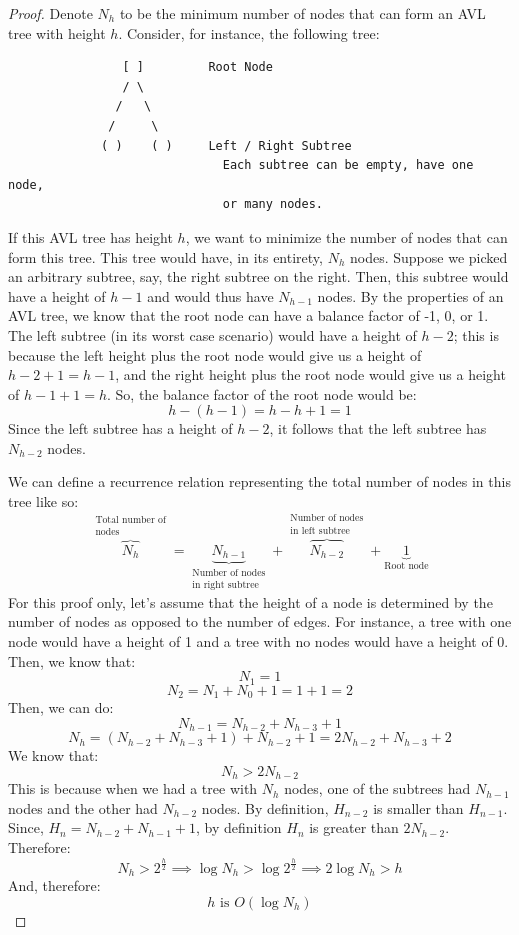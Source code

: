\documentclass[letterpaper]{article}
\begin{document}
\begin{mdframed}
    \begin{proof}
        Denote $N_h$ to be the minimum number of nodes that can form an AVL tree with height $h$. Consider, for instance, the following tree: 
    \begin{verbatim}
                [ ]         Root Node 
                / \          
               /   \ 
              /     \ 
             ( )    ( )     Left / Right Subtree 
                              Each subtree can be empty, have one node, 
                              or many nodes. 
    \end{verbatim}
    If this AVL tree has height $h$, we want to minimize the number of nodes that can form this tree. This tree would have, in its entirety, $N_h$ nodes. Suppose we picked an arbitrary subtree, say, the right subtree on the right. Then, this subtree would have a height of $h - 1$ and would thus have $N_{h - 1}$ nodes. By the properties of an AVL tree, we know that the root node can have a balance factor of -1, 0, or 1. The left subtree (in its worst case scenario) would have a height of $h - 2$; this is because the left height plus the root node would give us a height of $h - 2 + 1 = h - 1$, and the right height plus the root node would give us a height of $h - 1 + 1 = h$. So, the balance factor of the root node would be: 
    \[h - (h - 1) = h - h + 1 = 1\]
    Since the left subtree has a height of $h - 2$, it follows that the left subtree has $N_{h - 2}$ nodes. 

    \bigskip 

    We can define a recurrence relation representing the total number of nodes in this tree like so: 
    \[\overbrace{N_h}^{\substack{\text{Total number of} \\ \text{nodes}}} = \underbrace{N_{h - 1}}_{\substack{\text{Number of nodes} \\ \text{in right subtree}}} + \overbrace{N_{h - 2}}^{\substack{\text{Number of nodes} \\ \text{in left subtree}}} + \underbrace{1}_{\text{Root node}}\]
    For this proof only, let's assume that the height of a node is determined by the number of nodes as opposed to the number of edges. For instance, a tree with one node would have a height of 1 and a tree with no nodes would have a height of 0. Then, we know that: 
    \[N_1 = 1\]
    \[N_2 = N_1 + N_0 + 1 = 1 + 1 = 2\]
    Then, we can do: 
    \[N_{h - 1} = N_{h - 2} + N_{h - 3} + 1\]
    \[N_h = (N_{h - 2} + N_{h - 3} + 1) + N_{h - 2} + 1 = 2N_{h - 2} + N_{h - 3} + 2\]
    We know that: 
    \[N_h > 2N_{h - 2}\]
    This is because when we had a tree with $N_h$ nodes, one of the subtrees had $N_{h - 1}$ nodes and the other had $N_{h - 2}$ nodes. By definition, $H_{n - 2}$ is smaller than $H_{n - 1}$. Since, $H_n = N_{h - 2} + N_{h - 1} + 1$, by definition $H_n$ is greater than $2N_{h - 2}$. Therefore: 
    \[N_h > 2^{\frac{h}{2}} \implies \log N_h > \log 2^{\frac{h}{2}} \implies 2\log N_h > h\]
    And, therefore: 
    \[\boxed{h \text{ is } O(\log N_h)}\]
    \end{proof}
\end{mdframed}
\end{document}
